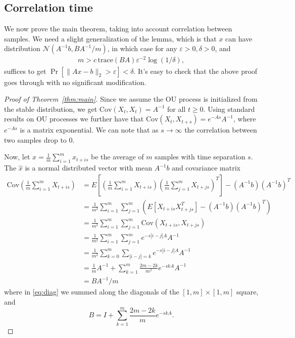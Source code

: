\documentclass[11pt]{article}
\newcommand{\eps}{\varepsilon}
\newcommand{\N}{\mathcal{N}}
\newcommand{\tr}{\mathrm{trace}}
\begin{document}
\subsection{Correlation time}

We now prove the main theorem, taking into account correlation between samples.
% 
We need a slight generalization of the lemma, which is that $x$ can have distribution $\N(A^{-1}b, BA^{-1}/m)$,
in which case
for any $\eps>0, \delta>0$, and
\begin{align}
    m > c\, \tr(BA) \eps^{-2} \log(1/\delta),
    \label{eq:lemma-generalized}
\end{align}
suffices to get
$
\Pr[\|A x - b\|_2 > \eps] < \delta.
$
It's easy to check that the above proof goes through with no significant modification.

\begin{proof}[Proof of Theorem~\ref{thm:main}]
Since we assume the OU process is initialized from the stable distribution, we get
$\text{Cov}(X_t, X_t) = A^{-1}$ for all $t\ge 0$.
Using standard results on OU processes we further have that
$\text{Cov}(X_t, X_{t+s}) = e^{-A s}A^{-1}$,
where $e^{-A s}$ is a matrix exponential.
We can note that as $s\to\infty$ the correlation between two samples drop to 0.

Now, let $\hat x = \frac{1}{m}\sum_{i=1}^m x_{t+i s}$ be the average of $m$ samples with time separation $s$.
The $\hat x$ is a normal distributed vector with mean $A^{-1}b$ and covariance matrix
\begin{align}
    \text{Cov}\left(
    \frac{1}{m}\sum_{i=1}^m X_{t+i s}
    \right)
    &=
    E\left[
        \left(\frac{1}{m}\sum_{i=1}^m X_{t+i s}\right)
        \left(\frac{1}{m}\sum_{j=1}^m X_{t+j s}\right)^T
    \right]
    - (A^{-1}b)(A^{-1}b)^T
    \nonumber\\&=
    \frac{1}{m^2}
    \sum_{i=1}^m
    \sum_{j=1}^m
    \left(
        E\left[
            X_{t+is}
            X_{t+js}^T
        \right]
        - (A^{-1}b)(A^{-1}b)^T
    \right)
    \nonumber\\&=
    \frac{1}{m^2}
    \sum_{i=1}^m
    \sum_{j=1}^m
        \text{Cov}(
            X_{t+is},
            X_{t+js}
        )
    \nonumber\\&=
    \frac{1}{m^2}
    \sum_{i=1}^m
    \sum_{j=1}^m
    e^{-s |i-j| A}
    A^{-1}
    \nonumber\\&=
    \frac{1}{m^2}
    \sum_{k=0}^{m}
    \sum_{|i-j|=k}
    e^{-s |i-j| A}
    A^{-1}
    \label{eq:diag}
    \\&=
    \frac{1}{m} A^{-1} + 
    \sum_{k=1}^{m}
    \frac{2m-2k}{m^2}
    e^{-s k A}
    A^{-1}
    \nonumber\\&=
    BA^{-1}/m
    \nonumber
\end{align}
where in \eqref{eq:diag} 
we summed along the diagonals of the $[1,m]\times[1,m]$ square,
and
\[
    B =
    I +
    \sum_{k=1}^{m}
    \frac{2m-2k}{m}
    e^{-s k A}
    .
\]


\end{proof}
\end{document}

